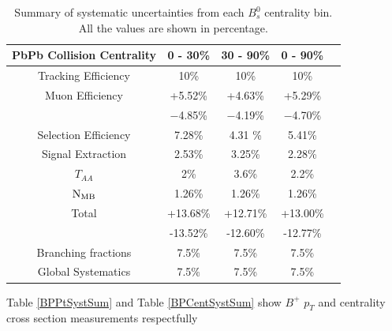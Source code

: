 \begin{table}[h]
\begin{center}
\caption{Summary of systematic uncertainties from each $B^0_s$ centrality bin. All the values are shown in percentage.}
\vspace{1em}
\label{BsCentSystSum}
\begin{tabular}{ |c | c | c | c | c|}
\hline
PbPb Collision Centrality &  0 - 30\% & 30 - 90\% & 0 - 90\%   \\
\hline
Tracking Efficiency & 10\% & 10\% & 10\% \\
Muon Efficiency     & +5.52\% & +4.63\% & +5.29\%  \\
                                & $-$4.85\% & $-$4.19\% & $-$4.70\%  \\
Selection Efficiency &  7.28\% & 4.31 \% & 5.41\%  \\
Signal Extraction & 2.53\%  & 3.25\% & 2.28\%  \\
$T_{AA}$ & 2\% & 3.6\% & 2.2\%\\	
$\rm{N_{MB}}$ & 1.26\% & 1.26\% & 1.26\% \\                                
 Total     &  +13.68\%  & +12.71\% & +13.00\% \\
 	      &  -13.52\%  & -12.60\% & -12.77\% \\
\hline
\hline
    Branching fractions &  7.5\%  &  7.5\%   &  7.5\% \\
      Global Systematics & 7.5\% & 7.5\% &  7.5\%\\ 
 \hline
\end{tabular}
\end{center}
\end{table}

Table \ref{BPPtSystSum} and Table \ref{BPCentSystSum} show $B^+$ $p_T$ and centrality cross section measurements respectfully


